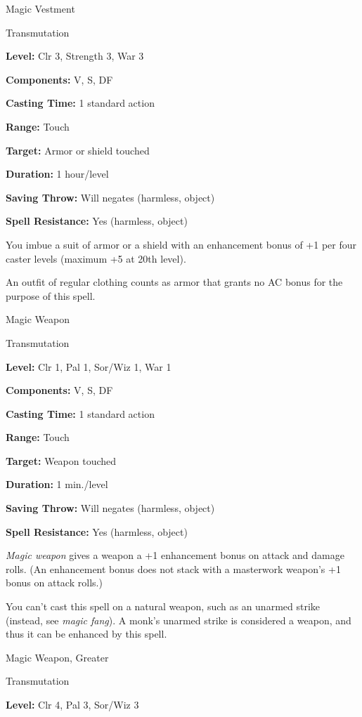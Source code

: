 \documentclass{article}
\begin{document}
\vspace{12pt}
Magic Vestment

Transmutation

\textbf{Level:} Clr 3, Strength 3, War 3

\textbf{Components:} V, S, DF

\textbf{Casting Time:} 1 standard action

\textbf{Range:} Touch

\textbf{Target:} Armor or shield touched

\textbf{Duration:} 1 hour/level

\textbf{Saving Throw: }Will negates (harmless, object)

\textbf{Spell Resistance:} Yes (harmless, object)

You imbue a suit of armor or a shield with an enhancement bonus of +1 per four 
caster levels (maximum +5 at 20th level).

An outfit of regular clothing counts as armor that grants no AC bonus for the purpose 
of this spell.

\vspace{12pt}
Magic Weapon

Transmutation

\textbf{Level:} Clr 1, Pal 1, Sor/Wiz 1, War 1

\textbf{Components:} V, S, DF

\textbf{Casting Time:} 1 standard action

\textbf{Range:} Touch

\textbf{Target: }Weapon touched

\textbf{Duration:} 1 min./level

\textbf{Saving Throw: }Will negates (harmless, object)

\textbf{Spell Resistance:} Yes (harmless, object)

\textit{Magic weapon }gives a weapon a +1 enhancement bonus on attack and damage 
rolls. (An enhancement bonus does not stack with a masterwork weapon's +1 bonus 
on attack rolls.)

You can't cast this spell on a natural weapon, such as an unarmed strike (instead, 
see \textit{magic fang}). A monk's unarmed strike is considered a weapon, and thus 
it can be enhanced by this spell.

\vspace{12pt}
Magic Weapon, Greater

Transmutation

\textbf{Level:} Clr 4, Pal 3, Sor/Wiz 3
\end{document}
